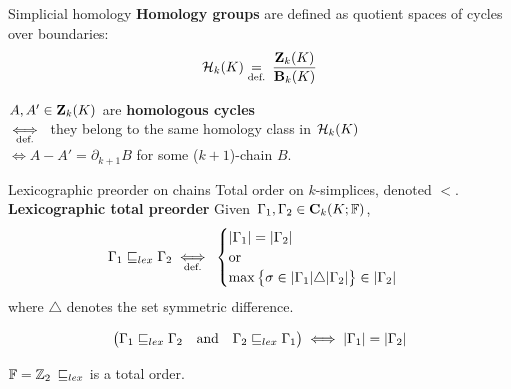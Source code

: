 \begin{frame}{Simplicial homology}
\textbf{Homology groups} are defined as quotient spaces of cycles over boundaries:
\[
\mathcal{H}_k(K) \underset{\text{def.}}{=} \: \frac{\mathbf{Z}_k(K)}{\mathbf{B}_k(K)}
\]

\pause

$A, A' \in \mathbf{Z}_k(K)$ are \textbf{homologous cycles} \\
\pause
\vspace*{5pt}
\hspace*{5pt} $\underset{\text{def.}}{\iff} \:$ they belong to the same homology class in $\mathcal{H}_k(K)$ \\
\pause
\vspace*{5pt}
\hspace*{5pt} $\iff A -  A' = \partial_{k+1}B$ for some ($k+1$)-chain $B$.

\pause

\begin{center}
\end{center}
\end{frame}

\begin{frame}{Lexicographic preorder on chains}
	Total order on $k$-simplices, denoted $<$.\\
	
	\textbf{Lexicographic total preorder} Given $\Gamma_1, \Gamma_2 \in \mathbf{C}_k(K; \mathbb{F})$,
		\[
		\Gamma_1 \sqsubseteq_{lex} \Gamma_2 \underset{\text{def.}}{\iff} \:
		\begin{cases} 
			|\Gamma_1| = |\Gamma_2| \\
			\operatorname{or} \\
			\max \big\{ \sigma \in |\Gamma_1| \triangle |\Gamma_2|  \big\}  \in |\Gamma_2|
		\end{cases}
		\]
		where $\triangle$ denotes the set symmetric difference.
		
	\[
		\big( \Gamma_1 \sqsubseteq_{lex} \Gamma_2 \quad \textrm{and} \quad  	\Gamma_2 
		\sqsubseteq_{lex}  \Gamma_1 \big) \iff |\Gamma_1| = |\Gamma_2| 
	\]
	
	\begin{alertblock}{$\mathbb{F} = \mathbb{Z}_2$}
		$\sqsubseteq_{lex}$ is a total order.
	\end{alertblock}
\end{frame}

